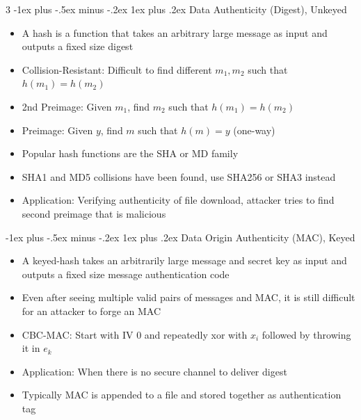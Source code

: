 \documentclass[10pt, landscape]{article}
\makeatletter
\renewcommand{\subsection}{\@startsection{subsection}{3}{0mm}%
                                {-1ex plus -.5ex minus -.2ex}%
                                {1ex plus .2ex}%
                                {\normalfont\small\bfseries}}%
\makeatother
\begin{document}
\begin{multicols*}{3}
\subsection{Data Authenticity (Digest), Unkeyed}
\begin{itemize}
    \item A hash is a function that takes an arbitrary large message as input and outputs a fixed size digest
    \item Collision-Resistant: Difficult to find  different $m_1, m_2$ such that $h(m_1)=h(m_2)$
    \item 2nd Preimage: Given $m_1$, find $m_2$ such that $h(m_1)=h(m_2)$
    \item Preimage: Given $y$, find $m$ such that $h(m)=y$ (one-way)
    \item Popular hash functions are the SHA or MD family
    \item SHA1 and MD5 collisions have been found, use SHA256 or SHA3 instead
    \item Application: Verifying authenticity of file download, attacker tries to find second preimage that is malicious
\end{itemize}

\subsection{Data Origin Authenticity (MAC), Keyed}
\begin{itemize}
    \item A keyed-hash takes an arbitrarily large message and secret key as input and outputs a fixed size message authentication code
    \item Even after seeing multiple valid pairs of messages and MAC, it is still difficult for an attacker to forge an MAC
    \item CBC-MAC: Start with IV $0$ and repeatedly xor with $x_i$ followed by throwing it in $e_k$
    \item Application: When there is no secure channel to deliver digest
    \item Typically MAC is appended to a file and stored together as authentication tag
\end{itemize}


\end{multicols*}
\end{document}
